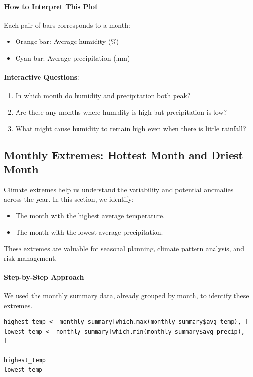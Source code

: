 \paragraph{How to Interpret This Plot} Each pair of bars corresponds to a month:
\begin{itemize}
  \item Orange bar: Average humidity (\%)
  \item Cyan bar: Average precipitation (mm)
\end{itemize}

\paragraph{Interactive Questions:}
\begin{enumerate}
  \item In which month do humidity and precipitation both peak?
  \item Are there any months where humidity is high but precipitation is low?
  \item What might cause humidity to remain high even when there is little rainfall?
\end{enumerate}

\subsection*{Monthly Extremes: Hottest Month and Driest Month}

Climate extremes help us understand the variability and potential anomalies across the year. In this section, we identify:
\begin{itemize}
  \item The month with the highest average temperature.
  \item The month with the lowest average precipitation.
\end{itemize}

These extremes are valuable for seasonal planning, climate pattern analysis, and risk management.

\paragraph{Step-by-Step Approach}

We used the monthly summary data, already grouped by month, to identify these extremes.

\begin{verbatim}
highest_temp <- monthly_summary[which.max(monthly_summary$avg_temp), ]
lowest_temp <- monthly_summary[which.min(monthly_summary$avg_precip), ]

highest_temp
lowest_temp
\end{verbatim}

